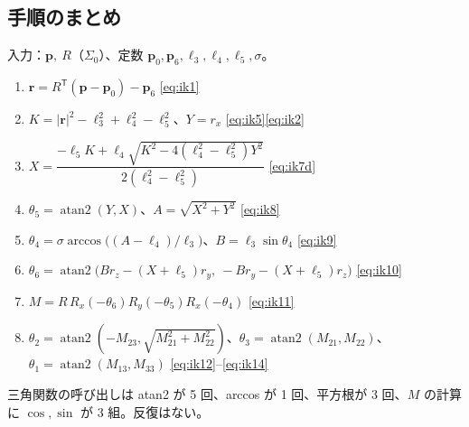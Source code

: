 \documentclass[a4paper,11pt]{ltjsarticle}
\newcommand{\Rx}{R_x}\newcommand{\Ry}{R_y}\newcommand{\Rz}{R_z}
\newcommand{\bp}{\boldsymbol{p}}\newcommand{\bo}{\boldsymbol{o}}\newcommand{\br}{\boldsymbol{r}}
\newcommand{\T}{^{\mathsf T}}
\begin{document}
\subsection{手順のまとめ}
\begin{shaded}
\noindent 入力：$\bp,\ R$（$\Sigma_0$）、定数 $\bp_0,\bp_6,\ell_3,\ell_4,\ell_5,\sigma$。
\begin{enumerate}
\item $\br=R\T(\bp-\bp_0)-\bp_6$ \hfill \eqref{eq:ik1}
\item $K=|\br|^2-\ell_3^2+\ell_4^2-\ell_5^2$、$Y=r_x$ \hfill \eqref{eq:ik5}\eqref{eq:ik2}
\item $X=\dfrac{-\ell_5K+\ell_4\sqrt{K^2-4(\ell_4^2-\ell_5^2)Y^2}}{2(\ell_4^2-\ell_5^2)}$ \hfill \eqref{eq:ik7d}
\item $\theta_5=\operatorname{atan2}(Y,X)$、$A=\sqrt{X^2+Y^2}$ \hfill \eqref{eq:ik8}
\item $\theta_4=\sigma\arccos\bigl((A-\ell_4)/\ell_3\bigr)$、$B=\ell_3\sin\theta_4$ \hfill \eqref{eq:ik9}
\item $\theta_6=\operatorname{atan2}\bigl(Br_z-(X+\ell_5)r_y,\ -Br_y-(X+\ell_5)r_z\bigr)$ \hfill \eqref{eq:ik10}
\item $M=R\,\Rx(-\theta_6)\Ry(-\theta_5)\Rx(-\theta_4)$ \hfill \eqref{eq:ik11}
\item $\theta_2=\operatorname{atan2}(-M_{23},\sqrt{M_{21}^2+M_{22}^2})$、$\theta_3=\operatorname{atan2}(M_{21},M_{22})$、$\theta_1=\operatorname{atan2}(M_{13},M_{33})$ \hfill \eqref{eq:ik12}--\eqref{eq:ik14}
\end{enumerate}
三角関数の呼び出しは atan2 が 5 回、arccos が 1 回、平方根が 3 回、$M$ の計算に $\cos,\sin$ が 3 組。反復はない。
\end{shaded}
\end{document}
